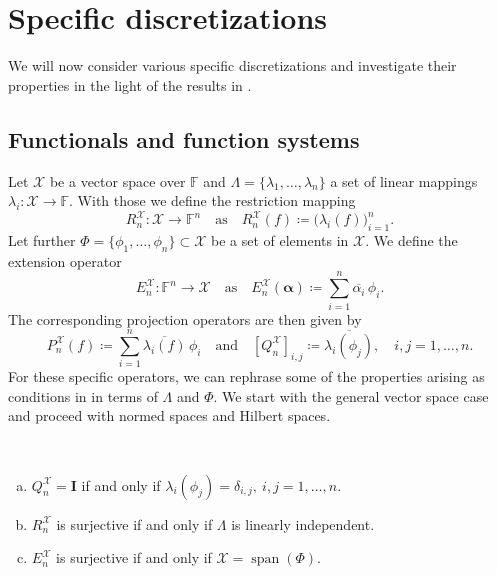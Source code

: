 \documentclass[a4paper]{paper}
\newcommand*{\SPC}[1]{{\ensuremath{\mathscr{#1}}}}
\newcommand*{\SPCX}{\SPC{X}}
\newcommand{\FIELD}{{\ensuremath{\mathbb{F}}}}
\newcommand*{\Fn}{{\ensuremath{\FIELD^n}}}
\newcommand*{\EXT}[2]{\ensuremath{E_{#1}^{#2}}}
\newcommand*{\REST}[2]{\ensuremath{R_{#1}^{#2}}}
\newcommand*{\PROJ}[2]{\ensuremath{P_{#1}^{#2}}}
\newcommand*{\COPROJ}[2]{\ensuremath{Q_{#1}^{#2}}}
\newcommand*{\RnX}{{\ensuremath{\REST{n}{\SPC{X}}}}}
\newcommand*{\EnX}{{\ensuremath{\EXT{n}{\SPC{X}}}}}
\newcommand*{\PnX}{{\ensuremath{\PROJ{n}{\SPCX}}}}
\newcommand*{\QnX}{{\ensuremath{\COPROJ{n}{\SPCX}}}}
\DeclareMathOperator{\SPAN}{span}
\newcommand{\valpha}{\boldsymbol{\alpha}}
\newcommand{\vI}{\boldsymbol{I}}
\begin{document}
\section{Specific discretizations}
\label{sec:specif}

We will now consider various specific discretizations and investigate their properties in the light of the 
results in .



\subsection{Functionals and function systems}
\label{subsec:specif:funct}

Let $\SPCX$ be a vector space over $\FIELD$ and $\Lambda = \{\lambda_1, \dotsc, \lambda_n\}$ a set of linear mappings
$\lambda_i \colon \SPCX \to \FIELD$. With those we define the restriction mapping
%
\begin{equation*}
 \RnX \colon \SPCX \to \Fn \quad \text{as} \quad \RnX(f) \coloneqq  \big( \lambda_i(f) \big)_{i=1}^n.
\end{equation*}
%
Let further $\Phi=\{\phi_1, \dotsc, \phi_n\} \subset \SPCX$ be a set of elements in $\SPCX$. We define the 
extension operator
%
\begin{equation*}
 \EnX \colon \Fn \to \SPCX \quad \text{as} \quad \EnX(\valpha) \coloneqq  \sum_{i=1}^n \overline{\alpha_i}\, \phi_i.
\end{equation*}
%
The corresponding projection operators are then given by
%
\begin{equation*}
 \PnX(f) \coloneqq  \sum_{i=1}^n \overline{\lambda_i(f)}\, \phi_i
 \quad \text{and} \quad
 \left[ \QnX \right]_{i,j} \coloneqq  \overline{\lambda_i(\phi_j)},\quad i,j=1,\dotsc,n.
\end{equation*}
%
For these specific operators, we can rephrase some of the properties arising as conditions in  
in terms of $\Lambda$ and $\Phi$. We start with the general vector space case and proceed with normed spaces and 
Hilbert spaces.


\begin{lemma}~
 \label{lemma:specif:funct:op_prop_vecspace}
 \begin{enumerate}[(a)]
  \item $\QnX = \vI$ if and only if $\lambda_i(\phi_j) = \delta_{i,j},\ i,j=1,\dotsc,n$.
  
  \item $\RnX$ is surjective if and only if $\Lambda$ is linearly independent.
  
  \item $\EnX$ is surjective if and only if $\SPCX = \SPAN(\Phi)$.
 \end{enumerate}
\end{lemma}
\vspace{1em}
\end{document}
